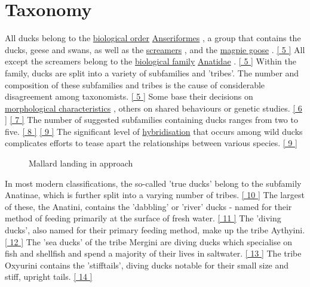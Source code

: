 \documentclass[11pt,a4paper]{article}
\begin{document}
\section{Taxonomy}

All ducks belong to the \href{/wiki/Order\_(biology)}{biological order} \href{/wiki/Anseriformes}{Anseriformes} , a group that contains the ducks, geese and swans, as well as the \href{/wiki/Screamer}{screamers} , and the \href{/wiki/Magpie\_goose}{magpie goose} . \href{\#cite\_note-FOOTNOTECarboneras1992536-5}{[ 5 ]} All except the screamers belong to the \href{/wiki/Family\_(biology)}{biological family} \href{/wiki/Anatidae}{Anatidae} . \href{\#cite\_note-FOOTNOTECarboneras1992536-5}{[ 5 ]} Within the family, ducks are split into a variety of subfamilies and 'tribes'. The number and composition of these subfamilies and tribes is the cause of considerable disagreement among taxonomists. \href{\#cite\_note-FOOTNOTECarboneras1992536-5}{[ 5 ]} Some base their decisions on \href{/wiki/Morphology\_(biology)}{morphological characteristics} , others on shared behaviours or genetic studies. \href{\#cite\_note-FOOTNOTELivezey1986737–738-6}{[ 6 ]} \href{\#cite\_note-FOOTNOTEMadsenMcHughde\_Kloet1988452-7}{[ 7 ]} The number of suggested subfamilies containing ducks ranges from two to five. \href{\#cite\_note-FOOTNOTEDonne-GousséLaudetHänni2002353–354-8}{[ 8 ]} \href{\#cite\_note-FOOTNOTECarboneras1992540-9}{[ 9 ]} The significant level of \href{/wiki/Hybrid\_(biology)}{hybridisation} that occurs among wild ducks complicates efforts to tease apart the relationships between various species. \href{\#cite\_note-FOOTNOTECarboneras1992540-9}{[ 9 ]}

\begin{figure}[h]
\caption{Mallard landing in approach}
\end{figure}

In most modern classifications, the so-called 'true ducks' belong to the subfamily Anatinae, which is further split into a varying number of tribes. \href{\#cite\_note-FOOTNOTEElphickDunningSibley2001191-10}{[ 10 ]} The largest of these, the Anatini, contains the 'dabbling' or 'river' ducks - named for their method of feeding primarily at the surface of fresh water. \href{\#cite\_note-FOOTNOTEKear2005448-11}{[ 11 ]} The 'diving ducks', also named for their primary feeding method, make up the tribe Aythyini. \href{\#cite\_note-FOOTNOTEKear2005622–623-12}{[ 12 ]} The 'sea ducks' of the tribe Mergini are diving ducks which specialise on fish and shellfish and spend a majority of their lives in saltwater. \href{\#cite\_note-FOOTNOTEKear2005686-13}{[ 13 ]} The tribe Oxyurini contains the 'stifftails', diving ducks notable for their small size and stiff, upright tails. \href{\#cite\_note-FOOTNOTEElphickDunningSibley2001193-14}{[ 14 ]}
\end{document}

